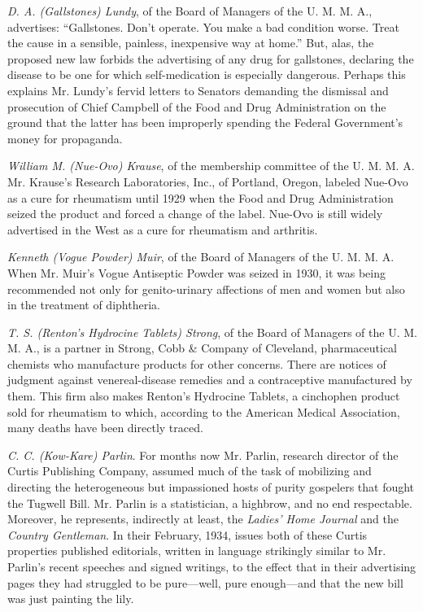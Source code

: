 \documentclass[twoside,nohyper,openany,nobib]{tufte-book}
\begin{document}
\emph{D. A. (Gallstones) Lundy}, of the Board of Managers of the U. M.
M. A., advertises: ``Gallstones. Don't operate. You make a bad condition
worse. Treat the cause in a sensible, painless, inexpensive way at
home.'' But, alas, the proposed new law forbids the advertising of any
drug for gallstones, declaring the disease to be one for which
self-medication is especially dangerous. Perhaps this explains Mr.
Lundy's fervid letters to Senators demanding the dismissal and
prosecution of Chief Campbell of the Food and Drug Administration on the
ground that the latter has been improperly spending the Federal
Government's money for propaganda.

\emph{William M. (Nue-Ovo) Krause}, of the membership committee of the
U. M. M. A. Mr. Krause's Research Laboratories, Inc., of Portland,
Oregon, labeled Nue-Ovo as a cure for rheumatism until 1929 when the
Food and Drug Administration seized the product and forced a change of
the label. Nue-Ovo is still widely advertised in the West as a cure for
rheumatism and arthritis.

\emph{Kenneth (Vogue Powder) Muir}, of the Board of Managers of the U.
M. M. A. When Mr. Muir's Vogue Antiseptic Powder was seized in 1930, it
was being recommended not only for genito-urinary affections of men and
women but also in the treatment of diphtheria.

\emph{T. S. (Renton's Hydrocine Tablets) Strong}, of the Board of
Managers of the U. M. M. A., is a partner in Strong, Cobb \& Company of
Cleveland, pharmaceutical chemists who manufacture products for other
concerns. There are notices of judgment against venereal-disease
remedies and a contraceptive manufactured by them. This firm also makes
Renton's Hydrocine Tablets, a cinchophen product sold for rheumatism to
which, according to the American Medical Association, many deaths have
been directly traced.

\emph{C. C. (Kow-Kare) Parlin}. For months now Mr. Parlin, research
director of the Curtis Publishing Company, assumed much of the task of
mobilizing and directing the heterogeneous but impassioned hosts of
purity gospelers that fought the Tugwell Bill. Mr. Parlin is a
statistician, a highbrow, and no end respectable. Moreover, he
represents, indirectly at least, the \emph{Ladies' Home Journal} and the
\emph{Country Gentleman}. In their February, 1934, issues both of these
Curtis properties published editorials, written in language strikingly
similar to Mr. Parlin's recent speeches and signed writings, to the
effect that in their advertising pages they had struggled to be
pure---well, pure enough---and that the new bill was just painting the
lily.
\end{document}
